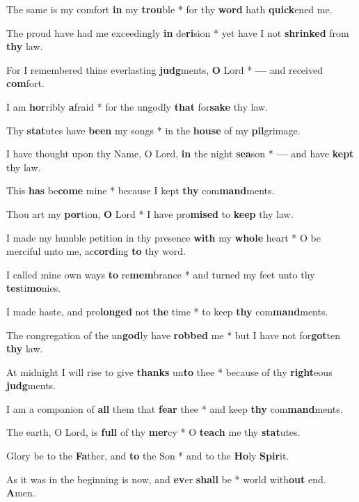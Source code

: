 \begin{multicols}{2}
	The same is my comfort \textbf{in} my \textbf{trou}ble * for thy \textbf{word} hath \textbf{quick}ened me.
	
	The proud have had me exceedingly \textbf{in} de\textbf{ri}sion * yet have I not \textbf{shrinked} from \textbf{thy} law.
	
	For I remembered thine everlasting \textbf{judg}ments, \textbf{O} Lord * \textbf{---} and received \textbf{com}fort.
	
	I am \textbf{hor}ribly \textbf{a}fraid * for the ungodly \textbf{that} for\textbf{sake} thy law.
	
	Thy \textbf{stat}utes have \textbf{been} my songs * in the \textbf{house} of my \textbf{pil}grimage.
	
	I have thought upon thy Name, O Lord, \textbf{in} the night \textbf{sea}son * \textbf{---} and have \textbf{kept} thy law.
	
	This \textbf{has} be\textbf{come} mine * because I kept \textbf{thy} com\textbf{mand}ments.
	
	Thou art my \textbf{por}tion, \textbf{O} Lord * I have pro\textbf{mised} to \textbf{keep} thy law.
	
	I made my humble petition in thy presence \textbf{with} my \textbf{whole} heart * O be merciful unto me, ac\textbf{cord}ing \textbf{to} thy word.
	
	I called mine own ways \textbf{to} re\textbf{mem}brance * and turned my feet unto thy \textbf{tes}ti\textbf{mo}nies.
	
	I made haste, and pro\textbf{longed} not \textbf{the} time * to keep \textbf{thy} com\textbf{mand}ments.
	
	The congregation of the un\textbf{god}ly have \textbf{robbed} me * but I have not for\textbf{got}ten \textbf{thy} law.
	
	At midnight I will rise to give \textbf{thanks} un\textbf{to} thee * because of thy \textbf{right}eous \textbf{judg}ments.
	
	I am a companion of \textbf{all} them that \textbf{fear} thee * and keep \textbf{thy} com\textbf{mand}ments.
	
	The earth, O Lord, is \textbf{full} of thy \textbf{mer}cy * O \textbf{teach} me thy \textbf{stat}utes.
	
	Glory be to the \textbf{Fa}ther, and \textbf{to} the Son * and to the \textbf{Ho}ly \textbf{Spir}it.
	
	As it was in the beginning is now, and \textbf{ev}er \textbf{shall} be * world with\textbf{out} end. \textbf{A}men.
\end{multicols}